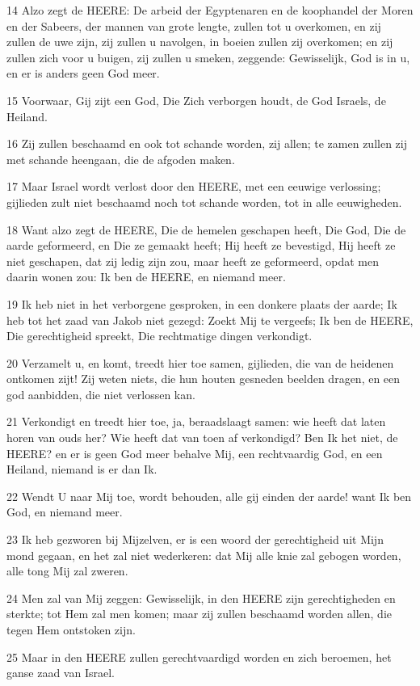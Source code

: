 \par 14 Alzo zegt de HEERE: De arbeid der Egyptenaren en de koophandel der Moren en der Sabeers, der mannen van grote lengte, zullen tot u overkomen, en zij zullen de uwe zijn, zij zullen u navolgen, in boeien zullen zij overkomen; en zij zullen zich voor u buigen, zij zullen u smeken, zeggende: Gewisselijk, God is in u, en er is anders geen God meer.
\par 15 Voorwaar, Gij zijt een God, Die Zich verborgen houdt, de God Israels, de Heiland.
\par 16 Zij zullen beschaamd en ook tot schande worden, zij allen; te zamen zullen zij met schande heengaan, die de afgoden maken.
\par 17 Maar Israel wordt verlost door den HEERE, met een eeuwige verlossing; gijlieden zult niet beschaamd noch tot schande worden, tot in alle eeuwigheden.
\par 18 Want alzo zegt de HEERE, Die de hemelen geschapen heeft, Die God, Die de aarde geformeerd, en Die ze gemaakt heeft; Hij heeft ze bevestigd, Hij heeft ze niet geschapen, dat zij ledig zijn zou, maar heeft ze geformeerd, opdat men daarin wonen zou: Ik ben de HEERE, en niemand meer.
\par 19 Ik heb niet in het verborgene gesproken, in een donkere plaats der aarde; Ik heb tot het zaad van Jakob niet gezegd: Zoekt Mij te vergeefs; Ik ben de HEERE, Die gerechtigheid spreekt, Die rechtmatige dingen verkondigt.
\par 20 Verzamelt u, en komt, treedt hier toe samen, gijlieden, die van de heidenen ontkomen zijt! Zij weten niets, die hun houten gesneden beelden dragen, en een god aanbidden, die niet verlossen kan.
\par 21 Verkondigt en treedt hier toe, ja, beraadslaagt samen: wie heeft dat laten horen van ouds her? Wie heeft dat van toen af verkondigd? Ben Ik het niet, de HEERE? en er is geen God meer behalve Mij, een rechtvaardig God, en een Heiland, niemand is er dan Ik.
\par 22 Wendt U naar Mij toe, wordt behouden, alle gij einden der aarde! want Ik ben God, en niemand meer.
\par 23 Ik heb gezworen bij Mijzelven, er is een woord der gerechtigheid uit Mijn mond gegaan, en het zal niet wederkeren: dat Mij alle knie zal gebogen worden, alle tong Mij zal zweren.
\par 24 Men zal van Mij zeggen: Gewisselijk, in den HEERE zijn gerechtigheden en sterkte; tot Hem zal men komen; maar zij zullen beschaamd worden allen, die tegen Hem ontstoken zijn.
\par 25 Maar in den HEERE zullen gerechtvaardigd worden en zich beroemen, het ganse zaad van Israel.

